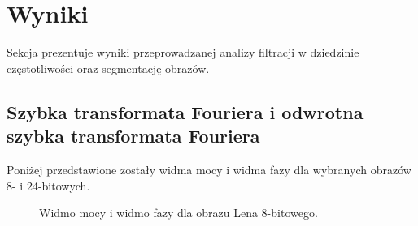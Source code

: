\documentclass{classrep}
\begin{document}
\section{Wyniki}
Sekcja prezentuje wyniki przeprowadzanej analizy filtracji w dziedzinie częstotliwości oraz segmentację obrazów.

\subsection{Szybka transformata Fouriera i odwrotna szybka transformata Fouriera}
Poniżej przedstawione zostały widma mocy i widma fazy dla wybranych obrazów 8- i 24-bitowych.

\begin{figure}[H]%
    \centering
    \qquad
    \qquad
    \qquad
    \qquad
    \qquad
    \qquad
    \caption{Widmo mocy i widmo fazy dla obrazu Lena 8-bitowego.}%
\end{figure} 
\end{document}
